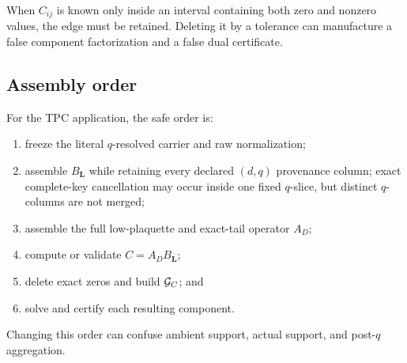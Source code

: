 \begin{remark}
When \(C_{ij}\) is known only inside an interval containing both zero
and nonzero values, the edge must be retained. Deleting it by a
tolerance can manufacture a false component factorization and a false
dual certificate.
\end{remark}

\subsection{Assembly order}

For the TPC application, the safe order is:
\begin{enumerate}[label=\textup{(\arabic*)},leftmargin=2.8em]
 \item freeze the literal \(q\)-resolved carrier and raw normalization;
 \item assemble \(B_{\boldsymbol L}\) while retaining every declared
       \((d,q)\) provenance column; exact complete-key cancellation may
       occur inside one fixed \(q\)-slice, but distinct \(q\)-columns
       are not merged;
 \item assemble the full low-plaquette and exact-tail operator \(A_D\);
 \item compute or validate \(C=A_DB_{\boldsymbol L}\);
 \item delete exact zeros and build \(\mathcal G_C\); and
 \item solve and certify each resulting component.
\end{enumerate}
Changing this order can confuse ambient support, actual support, and
post-\(q\) aggregation.
